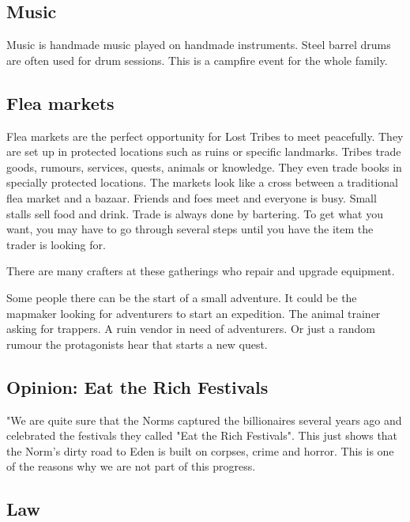 \subsection{Music}

Music is handmade music played on handmade instruments. Steel barrel drums are often used for drum sessions. This is a campfire event for the whole family.

\subsection{Flea markets}

Flea markets are the perfect opportunity for Lost Tribes to meet peacefully. They are set up in protected locations such as ruins or specific landmarks. Tribes trade goods, rumours, services, quests, animals or knowledge. They even trade books in specially protected locations.
The markets look like a cross between a traditional flea market and a bazaar. Friends and foes meet and everyone is busy. Small stalls sell food and drink.
Trade is always done by bartering. To get what you want, you may have to go through several steps until you have the item the trader is looking for.

There are many crafters at these gatherings who repair and upgrade equipment.

Some people there can be the start of a small adventure. It could be the mapmaker looking for adventurers to start an expedition. The animal trainer asking for trappers. A ruin vendor in need of adventurers. Or just a random rumour the protagonists hear that starts a new quest.

\subsection{Opinion: Eat the Rich Festivals}

"We are quite sure that the Norms captured the billionaires several years ago and celebrated the festivals they called "Eat the Rich Festivals". This just shows that the Norm's dirty road to Eden is built on corpses, crime and horror. This is one of the reasons why we are not part of this progress.

\subsection{Law}
\label{sec:Lost law}

